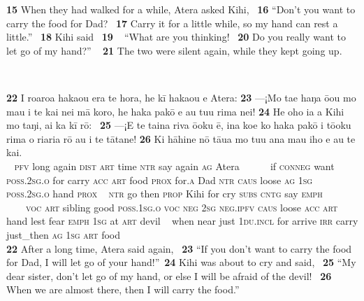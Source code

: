 \medskip\glt
\textbf{\textup{15}} When they had walked for a while, Atera asked Kihi, ~\textbf{\textup{16}} “Don’t you want to carry the food for Dad? ~\textbf{\textup{17}} Carry it for a little while, so my hand can rest a little.” ~\textbf{\textup{18}} Kihi said ~\textbf{\textup{19~~}}“What are you thinking! ~\textbf{\textup{20}} Do you really want to let go of my hand?” ~
\textbf{\textup{21}} The two were silent again, while they kept going up.


~

\bigskip\gll
\textbf{\textup{22}} I roaroa haka{\ꞌ}ou era te hora, he kī haka{\ꞌ}ou e {\ꞌ}Atera: \textbf{\textup{23}} —¡Mo ta{\ꞌ}e haŋa ō{\ꞌ}ou mo ma{\ꞌ}u i te kai nei mā koro, he haka pakō e au tu{\ꞌ}u rima nei! \textbf{\textup{24}} He oho ia a Kihi mo taŋi, {\ꞌ}ai ka kī rō: ~\textbf{\textup{25}} —¡E te taina riva ō{\ꞌ}oku ē, {\ꞌ}ina koe ko haka pakō i tō{\ꞌ}oku rima {\ꞌ}o ri{\ꞌ}ari{\ꞌ}a rō au {\ꞌ}i te tātane! \textbf{\textup{26}} Ki hāhine nō tāua mo tu{\ꞌ}u ana ma{\ꞌ}u iho e au te kai.\\
~ \textsc{pfv} long again \textsc{dist} \textsc{art} time \textsc{ntr} say again \textsc{ag} Atera ~ ~~~~if \textsc{conneg} want \textsc{poss.2sg.o} for carry \textsc{acc} \textsc{art} food \textsc{prox} for\textsc{.a} Dad \textsc{ntr} \textsc{caus} loose \textsc{ag} \textsc{1sg} \textsc{poss.2sg.o} hand \textsc{prox} ~ \textsc{ntr} go then \textsc{prop} Kihi for cry \textsc{subs} \textsc{cntg} say \textsc{emph} ~ ~~~~\textsc{voc} \textsc{art} sibling good \textsc{poss.1sg.o} \textsc{voc} \textsc{neg} \textsc{2sg} \textsc{neg.ipfv} \textsc{caus} loose \textsc{acc} \textsc{art} hand lest fear \textsc{emph} \textsc{1sg} at \textsc{art} devil  ~ when near just \textsc{1du.incl} for arrive \textsc{irr} carry just\_then \textsc{ag} \textsc{1sg} \textsc{art} food\\

\medskip\glt
\textbf{\textup{22}} After a long time, Atera said again, ~\textbf{\textup{23}} “If you don’t want to carry the food for Dad, I will let go of your hand!”~\textbf{\textup{24}} Kihi was about to cry and said, ~\textbf{\textup{25}} “My dear sister, don’t let go of my hand, or else I will be afraid of the devil! ~\textbf{\textup{26}} When we are almost there, then I will carry the food.”


~

